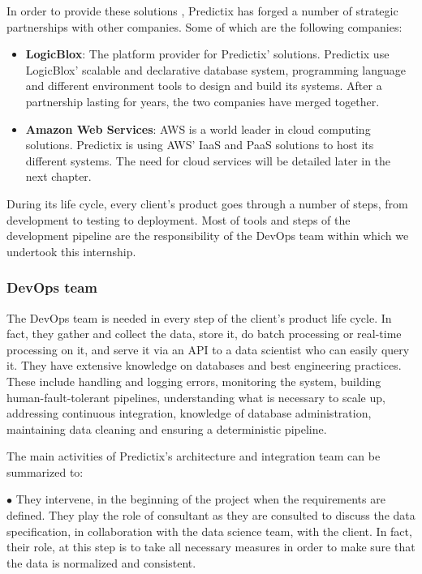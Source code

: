 \noindent In order to provide these solutions , Predictix has forged a number of
strategic partnerships with other companies. Some of which are the following
companies:

\begin{itemize}
  \item{\textbf{LogicBlox}: The platform provider for Predictix' solutions. Predictix use
LogicBlox' scalable and declarative database system, programming language and
different environment tools to design and build  its systems. After a
partnership lasting for years, the two companies have merged together.}

\item{\textbf{Amazon Web Services}: AWS is a world leader in cloud computing
solutions. Predictix is using AWS' IaaS and PaaS solutions to host its different
systems. The need for cloud services will be detailed later in the next chapter.}
\end{itemize}

During its life cycle, every client's product goes through a number of steps,
from development to testing to deployment. Most of tools and steps of the
development pipeline are the responsibility of the DevOps team within which we
undertook this internship.

\subsubsection{DevOps team}

The DevOps team is needed in every step of the client's product life cycle. In 
fact, they gather and collect the data, store it, do batch processing or
real-time processing on it, and serve it via an API to a data scientist who can
easily query it. They have extensive knowledge on databases and best
engineering practices. These include handling and logging errors, monitoring
the system, building human-fault-tolerant pipelines, understanding what is
necessary to scale up, addressing continuous integration, knowledge of database
administration, maintaining data cleaning and ensuring a deterministic
pipeline.

The main activities of Predictix's architecture and integration team can be
summarized to:

$\bullet$ They intervene, in the beginning of the project when the requirements are
defined. They play the role of consultant as they are consulted to discuss the
data specification, in collaboration with the data science team, with the
client. In fact, their role, at this step is to take all necessary measures in
order to make sure that the data is normalized and consistent.

